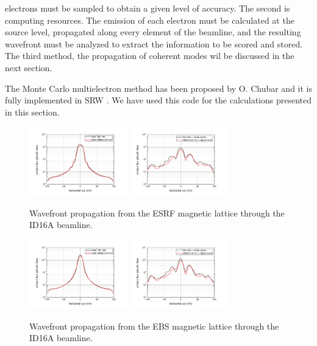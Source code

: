 \documentclass{iucr}              %
\begin{document}
electrons must be sampled to obtain a given level of accuracy. The second is computing resources. The emission of each electron must be calculated at the source level, propagated along every element of the beamline, and the resulting wavefront must be analyzed to extract the information to be scored and stored. The third method, the propagation of coherent modes wil be discussed in the next section. 

The Monte Carlo multielectron method has been proposed by O. Chubar and it is fully implemented in SRW \cite{codeSRW}. We have used this code for the calculations presented in this section.  

\begin{figure}
    \centering
        \includegraphics[width=4.25cm]{GRAPHICS/esrf_idealTE_idealOE_h.pdf}
        \includegraphics[width=4.25cm]{GRAPHICS/esrf_slopeTE_slopeOE_h.pdf}
    \label{fig:FiniteEmittanceA}
    \caption{Wavefront propagation from the ESRF magnetic lattice through the ID16A beamline.}
\end{figure}

\begin{figure}
    \centering
        \includegraphics[width=4.25cm]{GRAPHICS/ebs_idealTE_idealOE_h.pdf}
        \includegraphics[width=4.25cm]{GRAPHICS/ebs_slopeTE_slopeOE_h.pdf}
    \label{fig:FiniteEmittanceB}
    \caption{Wavefront propagation from the EBS magnetic lattice through the ID16A beamline.}
\end{figure}
\end{document}
